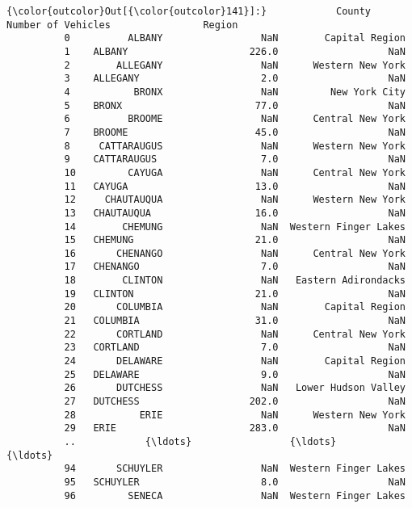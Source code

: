 \documentclass[11pt]{article}
\begin{document}
\begin{Verbatim}[commandchars=\\\{\}]
{\color{outcolor}Out[{\color{outcolor}141}]:}            County  Number of Vehicles                Region
          0          ALBANY                 NaN        Capital Region
          1    ALBANY                     226.0                   NaN
          2        ALLEGANY                 NaN      Western New York
          3    ALLEGANY                     2.0                   NaN
          4           BRONX                 NaN         New York City
          5    BRONX                       77.0                   NaN
          6          BROOME                 NaN      Central New York
          7    BROOME                      45.0                   NaN
          8     CATTARAUGUS                 NaN      Western New York
          9    CATTARAUGUS                  7.0                   NaN
          10         CAYUGA                 NaN      Central New York
          11   CAYUGA                      13.0                   NaN
          12     CHAUTAUQUA                 NaN      Western New York
          13   CHAUTAUQUA                  16.0                   NaN
          14        CHEMUNG                 NaN  Western Finger Lakes
          15   CHEMUNG                     21.0                   NaN
          16       CHENANGO                 NaN      Central New York
          17   CHENANGO                     7.0                   NaN
          18        CLINTON                 NaN   Eastern Adirondacks
          19   CLINTON                     21.0                   NaN
          20       COLUMBIA                 NaN        Capital Region
          21   COLUMBIA                    31.0                   NaN
          22       CORTLAND                 NaN      Central New York
          23   CORTLAND                     7.0                   NaN
          24       DELAWARE                 NaN        Capital Region
          25   DELAWARE                     9.0                   NaN
          26       DUTCHESS                 NaN   Lower Hudson Valley
          27   DUTCHESS                   202.0                   NaN
          28           ERIE                 NaN      Western New York
          29   ERIE                       283.0                   NaN
          ..            {\ldots}                 {\ldots}                   {\ldots}
          94       SCHUYLER                 NaN  Western Finger Lakes
          95   SCHUYLER                     8.0                   NaN
          96         SENECA                 NaN  Western Finger Lakes

\end{Verbatim}
\end{document}
